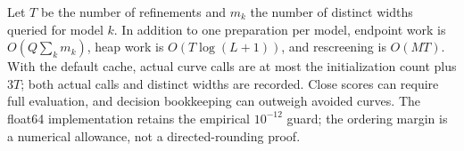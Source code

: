 Let $T$ be the number of refinements and $m_k$ the number of distinct widths
queried for model $k$. In addition to one preparation per model, endpoint work
is $O(Q\sum_km_k)$, heap work is $O(T\log(L+1))$, and rescreening is $O(MT)$.
With the default cache, actual curve calls are at most the initialization
count plus $3T$; both actual calls and distinct widths are recorded.
Close scores can require full evaluation, and decision bookkeeping can
outweigh avoided curves. The float64 implementation retains the empirical
$10^{-12}$ guard; the ordering margin is a numerical allowance, not a
directed-rounding proof.
